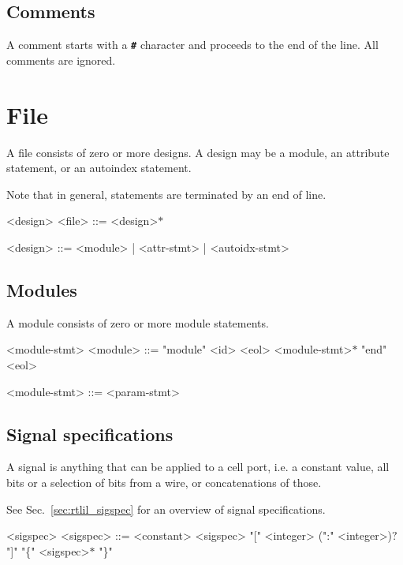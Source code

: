 \subsection{Comments}

A comment starts with a \texttt{\textbf{\#}} character and proceeds to the end of the line. All comments are ignored.

\section{File}

A file consists of zero or more designs. A design may be a module, an attribute statement, or an autoindex statement.

Note that in general, statements are terminated by an end of line.

\begin{indentgrammar}{<design>}
<file> ::= <design>$*$

<design> ::= <module> | <attr-stmt> | <autoidx-stmt>
\end{indentgrammar}

\subsection{Modules}

A module consists of zero or more module statements.

\begin{indentgrammar}{<module-stmt>}
<module> ::= "module" <id> <eol> <module-stmt>$*$ "end" <eol>

<module-stmt> ::= 
<param-stmt>
\end{indentgrammar}

\subsection{Signal specifications}

A signal is anything that can be applied to a cell port, i.e. a constant value, all bits or a selection of bits from a wire, or concatenations of those.

See Sec.~\ref{sec:rtlil_sigspec} for an overview of signal specifications.

\begin{indentgrammar}{<sigspec>}
<sigspec> ::=
<constant>
    \alt <sigspec> "[" <integer> (":" <integer>)$?$ "]"
    \alt "\{" <sigspec>$*$ "\}"
\end{indentgrammar}

